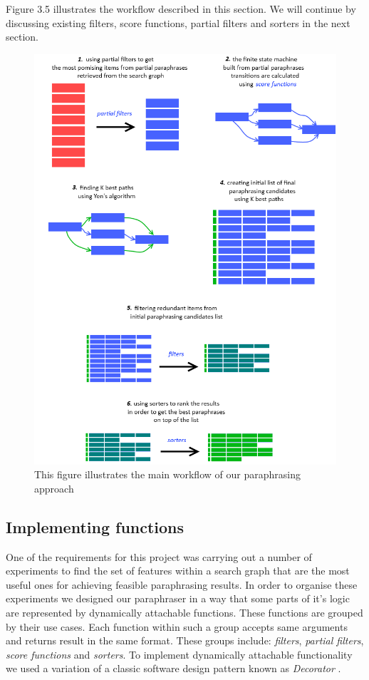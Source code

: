 Figure 3.5 illustrates the workflow described in this section. We will continue by discussing existing filters, score functions, partial filters and sorters in the next section.

\begin{figure}
 \centering 
 \includegraphics[scale=0.82]{g/main-workflow.png}
 \caption{This figure illustrates the main workflow of our paraphrasing approach}
\end{figure}

\subsection{Implementing functions}

One of the requirements for this project was carrying out a number of experiments to find the set of features within a search graph that are the most useful ones for achieving feasible paraphrasing results. In order to organise these experiments we designed our paraphraser in a way that some parts of it's logic are represented by dynamically attachable functions. These functions are grouped by their use cases. Each function within such a group accepts same arguments and returns result in the same format. These groups include: \emph{filters}, \emph{partial filters}, \emph{score functions} and \emph{sorters}. To implement dynamically attachable functionality we used a variation of a classic software design pattern known as \emph{Decorator} \citep{vlissides1995design}.


